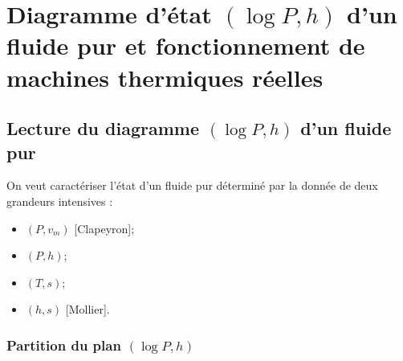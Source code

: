 \section[Diagramme d'état et machines réelles]{Diagramme d'état \texorpdfstring{$(\log P,h)$}{(log P,h)} d'un fluide pur et fonctionnement de machines thermiques réelles}

    \subsection{Lecture du diagramme \texorpdfstring{$(\log P,h)$}{(log P,h)} d'un fluide pur}

        On veut caractériser l'état d'un fluide pur déterminé par la donnée de deux grandeurs intensives :
        \begin{itemize}
            \item $(P,v_m)$ [Clapeyron];
            \item $(P,h)$;
            \item $(T,s)$;
            \item $(h,s)$ [Mollier].
        \end{itemize}

        \subsubsection{Partition du plan $(\log P,h)$}


